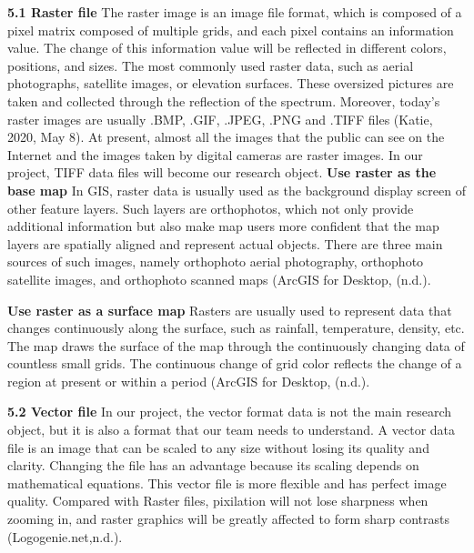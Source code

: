 \documentclass[conference]{IEEEtran}
\begin{document}
\small {\bf 5.1 Raster file\rm} 
The raster image is an image file format, which is composed of a pixel matrix composed of multiple grids, and each pixel contains an information value. The change of this information value will be reflected in different colors, positions, and sizes. The most commonly used raster data, such as aerial photographs, satellite images, or elevation surfaces. These oversized pictures are taken and collected through the reflection of the spectrum. Moreover, today's raster images are usually .BMP, .GIF, .JPEG, .PNG and .TIFF files (Katie, 2020, May 8). At present, almost all the images that the public can see on the Internet and the images taken by digital cameras are raster images. In our project, TIFF data files will become our research object.
{\bf Use raster as the base map\rm}
In GIS, raster data is usually used as the background display screen of other feature layers. Such layers are orthophotos, which not only provide additional information but also make map users more confident that the map layers are spatially aligned and represent actual objects. There are three main sources of such images, namely orthophoto aerial photography, orthophoto satellite images, and orthophoto scanned maps (ArcGIS for Desktop, (n.d.).

{\bf Use raster as a surface map\rm}
Rasters are usually used to represent data that changes continuously along the surface, such as rainfall, temperature, density, etc. The map draws the surface of the map through the continuously changing data of countless small grids. The continuous change of grid color reflects the change of a region at present or within a period (ArcGIS for Desktop, (n.d.).

{\bf 5.2 Vector file\rm}
In our project, the vector format data is not the main research object, but it is also a format that our team needs to understand. A vector data file is an image that can be scaled to any size without losing its quality and clarity. Changing the file has an advantage because its scaling depends on mathematical equations. This vector file is more flexible and has perfect image quality. Compared with Raster files, pixilation will not lose sharpness when zooming in, and raster graphics will be greatly affected to form sharp contrasts (Logogenie.net,n.d.).
\end{document}
